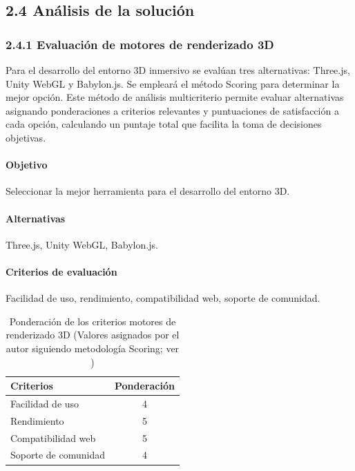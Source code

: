 \subsection{2.4 Análisis de la solución}

\subsubsection{2.4.1 Evaluación de motores de renderizado 3D}
Para el desarrollo del entorno 3D inmersivo se evalúan tres alternativas: Three.js, Unity WebGL y Babylon.js. Se empleará el método Scoring \cite{belton2002} para determinar la mejor opción. Este método de análisis multicriterio permite evaluar alternativas asignando ponderaciones a criterios relevantes y puntuaciones de satisfacción a cada opción, calculando un puntaje total que facilita la toma de decisiones objetivas.

\paragraph{Objetivo}
Seleccionar la mejor herramienta para el desarrollo del entorno 3D.

\paragraph{Alternativas}
Three.js, Unity WebGL, Babylon.js.

\paragraph{Criterios de evaluación}
Facilidad de uso, rendimiento, compatibilidad web, soporte de comunidad.
\begin{table}[ht]
\centering
\caption{Ponderación de los criterios motores de renderizado 3D (Valores asignados por el autor siguiendo metodología Scoring; ver \cite{belton2002})}
\begin{tabular}{l c}
\hline
Criterios & Ponderación \\
\hline
Facilidad de uso & 4 \\
Rendimiento & 5 \\
Compatibilidad web & 5 \\
Soporte de comunidad & 4 \\
\hline
\end{tabular}
\end{table}

